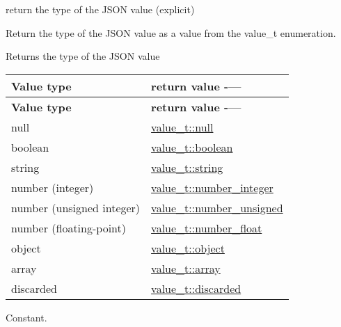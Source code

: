 return the type of the J\+S\+ON value (explicit) 

Return the type of the J\+S\+ON value as a value from the value\+\_\+t enumeration.

\begin{DoxyReturn}{Returns}
the type of the J\+S\+ON value \tabulinesep=1mm
\begin{longtabu} spread 0pt [c]{*{2}{|X[-1]}|}
\hline
\rowcolor{\tableheadbgcolor}\textbf{ Value type  }&\textbf{ return value -\/---   }\\
\endfirsthead
\hline
\endfoot
\hline
\rowcolor{\tableheadbgcolor}\textbf{ Value type  }&\textbf{ return value -\/---   }\\
\endhead
null  &\mbox{\hyperlink{namespacenlohmann_1_1detail_a1ed8fc6239da25abcaf681d30ace4985a37a6259cc0c1dae299a7866489dff0bd}{value\+\_\+t\+::null}}   \\
boolean  &\mbox{\hyperlink{namespacenlohmann_1_1detail_a1ed8fc6239da25abcaf681d30ace4985a84e2c64f38f78ba3ea5c905ab5a2da27}{value\+\_\+t\+::boolean}}   \\
string  &\mbox{\hyperlink{namespacenlohmann_1_1detail_a1ed8fc6239da25abcaf681d30ace4985ab45cffe084dd3d20d928bee85e7b0f21}{value\+\_\+t\+::string}}   \\
number (integer)  &\mbox{\hyperlink{namespacenlohmann_1_1detail_a1ed8fc6239da25abcaf681d30ace4985a5763da164f8659d94a56e29df64b4bcc}{value\+\_\+t\+::number\+\_\+integer}}   \\
number (unsigned integer)  &\mbox{\hyperlink{namespacenlohmann_1_1detail_a1ed8fc6239da25abcaf681d30ace4985adce7cc8ec29055c4158828921f2f265e}{value\+\_\+t\+::number\+\_\+unsigned}}   \\
number (floating-\/point)  &\mbox{\hyperlink{namespacenlohmann_1_1detail_a1ed8fc6239da25abcaf681d30ace4985ad9966ecb59667235a57b4b999a649eef}{value\+\_\+t\+::number\+\_\+float}}   \\
object  &\mbox{\hyperlink{namespacenlohmann_1_1detail_a1ed8fc6239da25abcaf681d30ace4985aa8cfde6331bd59eb2ac96f8911c4b666}{value\+\_\+t\+::object}}   \\
array  &\mbox{\hyperlink{namespacenlohmann_1_1detail_a1ed8fc6239da25abcaf681d30ace4985af1f713c9e000f5d3f280adbd124df4f5}{value\+\_\+t\+::array}}   \\
discarded  &\mbox{\hyperlink{namespacenlohmann_1_1detail_a1ed8fc6239da25abcaf681d30ace4985a94708897ec9db8647dfe695714c98e46}{value\+\_\+t\+::discarded}}   \\
\end{longtabu}

\end{DoxyReturn}
Constant.

